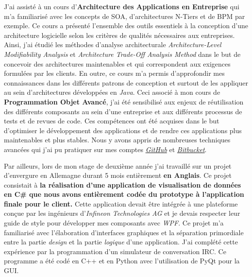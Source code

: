 J'ai assisté à un cours d'\textbf{Architecture des Applications en Entreprise} qui m'a familiarisé avec les concepts de SOA, d'architectures N-Tiers et de BPM par exemple. Ce cours a présenté l'ensemble des outils essentiels à la conception d'une architecture logicielle selon les critères de qualités nécessaires aux entreprises. Ainsi, j'ai étudié les méthodes d'analyse architecturale \textit{Architecture-Level Modifiability Analysis} et \textit{Architecture Trade-Off Analysis Method} dans le but de concevoir des architectures maintenables et qui correspondent aux exigences formulées par les clients. En outre, ce cours m'a permis d'approfondir mes connaissances dans les différents patrons de conception et surtout de les appliquer au sein d'architectures développées en \textit{Java}. Ceci associé à mon cours de \textbf{Programmation Objet Avancé}, j'ai été sensibilisé aux enjeux de réutilisation des différents composants au sein d'une entreprise et aux différents processus de tests et de revues de code. Ces compétences ont été acquises dans le but d'optimiser le développement des applications et de rendre ces applications plus maintenables et plus stables. Nous y avons appris de nombreuses techniques avancées qui j'ai pu pratiquer sur mes comptes \href{https://github.com/vlnk/ShootYourFridge}{\textit{GitHub}} et \href{https://bitbucket.org/vlnk/tronpoa}{\textit{Bitbucket}}.

Par ailleurs, lors de mon stage de deuxième année j'ai travaillé sur un projet d'envergure en Allemagne durant 5 mois entièrement \textbf{en Anglais}. Ce projet consistait à \textbf{la réalisation d'une application de visualisation de données en C\# que nous avons entièrement codée du prototype à l'application finale pour le client.} Cette application devait être intégrée à une plateforme conçue par les ingénieurs d'\textit{Infineon Technologies AG} et je devais respecter leur guide de style pour développer mes composants avec \textit{WPF}. Ce projet m'a familiarisé avec l'élaboration d'interfaces graphiques et la séparation primordiale entre la partie \textit{design} et la partie \textit{logique} d'une application. J'ai complété cette expérience par la programmation d'un simulateur de conversation IRC. Ce programme a été codé en C++ et en Python avec l'utilisation de PyQt pour la GUI. \conclusion{}
\makeletterclosing
